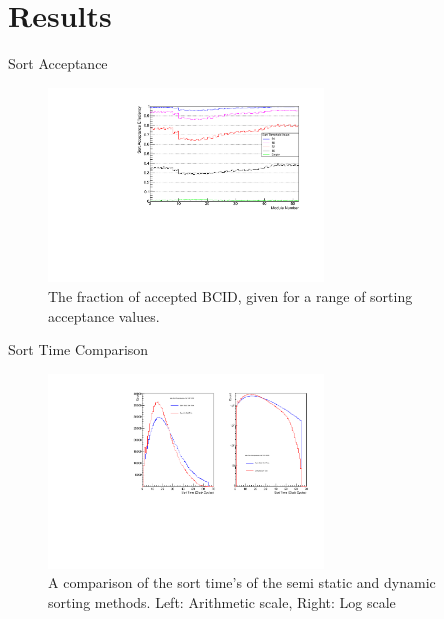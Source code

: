 \documentclass[10pt, compress]{beamer}
\begin{document}
\section{Results}
\begin{frame}{Sort Acceptance}
	\begin{figure}
		\caption{The fraction of accepted BCID, given for a range of sorting acceptance values.} \vspace{-3.5em}
		\includegraphics[width=0.65\textwidth,angle=-90]{figs/Sort_Acceptance_Efficiancy.pdf}
		\centering
	\end{figure}
\end{frame}

\begin{frame}{Sort Time Comparison}
	\begin{figure}
		\caption{A comparison of the sort time's of the semi static and dynamic sorting methods. Left: Arithmetic  scale, Right: Log scale} \vspace{-3.5em}
		\includegraphics[width=0.65\textwidth,angle=-90]{figs/semiStat_dyn_sort_time.pdf}
		\centering
	\end{figure}
\end{frame}
\end{document}
